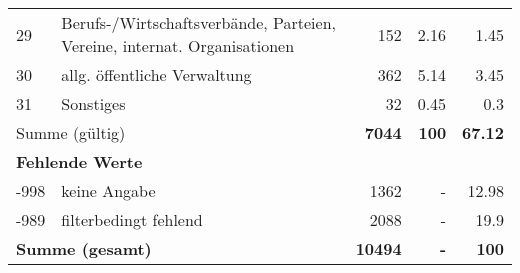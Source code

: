 \begin{longtable}{lXrrr}
        29 & \multicolumn{1}{X}{Berufs-/Wirtschaftsverbände, Parteien, Vereine, internat. Organisationen} & %
          \num{152} &
          \num[round-mode=places,round-precision=2]{2.16} &
          \num[round-mode=places,round-precision=2]{1.45} \\

        30 & \multicolumn{1}{X}{allg. öffentliche Verwaltung} & %
          \num{362} &
          \num[round-mode=places,round-precision=2]{5.14} &
          \num[round-mode=places,round-precision=2]{3.45} \\

        31 & \multicolumn{1}{X}{Sonstiges} & %
          \num{32} &
          \num[round-mode=places,round-precision=2]{0.45} &
          \num[round-mode=places,round-precision=2]{0.3} \\

     \midrule
     \multicolumn{2}{l}{Summe (gültig)} &
       \textbf{\num{7044}} &
     \textbf{\num{100}} &
       \textbf{\num[round-mode=places,round-precision=2]{67.12}} \\
     \multicolumn{5}{l}{\textbf{Fehlende Werte}}\\
       -998 &
       keine Angabe &
         \num{1362} &
        - &
         \num[round-mode=places,round-precision=2]{12.98} \\
       -989 &
       filterbedingt fehlend &
         \num{2088} &
        - &
         \num[round-mode=places,round-precision=2]{19.9} \\
     \midrule
     \multicolumn{2}{l}{\textbf{Summe (gesamt)}} &
          \textbf{\num{10494}} &
        \textbf{-} &
        \textbf{\num{100}} \\
     \bottomrule
     \end{longtable}
     
